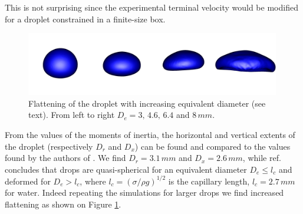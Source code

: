 This is not surprising since the experimental terminal velocity would be 
modified for a droplet constrained in a finite-size box.
\begin{figure}
\begin{center}
\includegraphics[width=0.99\textwidth]{Figures/flatten.png}
\end{center}
\caption{Flattening of the droplet with increasing equivalent diameter 
(see text). From left to right $D_e=3, \,4.6,\, 6.4$ and $8\, mm$.}
\label{flatten}
\end{figure}
From the values of the moments of inertia, the horizontal and vertical 
extents of the droplet (respectively $D_r$ and $D_x$) can be found 
and compared to the values found by the authors of \cite{Reyssat:2007ko}. 
We find $D_r=3.1 \,mm$ and $D_x=2.6 \,mm$, while ref. \cite{Reyssat:2007ko} 
concludes that drops are quasi-spherical for an equivalent diameter 
$D_e \le l_c$ and deformed for $D_e > l_c$, where $l_c =(\sigma/\rho g)^{1/2}$ 
is the capillary length, $l_c = 2.7 \,mm$ for water. 
Indeed repeating the simulations for larger drops we find increased 
flattening as shown on Figure \ref{flatten}. 
%

